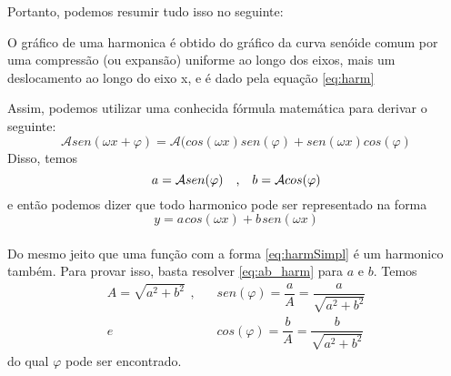Portanto, podemos resumir tudo isso no seguinte:\\
\begin{definicao}
    O gráfico de uma harmonica é obtido do gráfico da curva senóide 
    comum por uma compressão (ou expansão) uniforme ao longo dos eixos,
    mais um deslocamento ao longo do eixo x, e é dado pela equação \ref{eq:harm}
\end{definicao}


Assim, podemos utilizar uma conhecida fórmula matemática para derivar
o seguinte:\\
\begin{equation}
    \mathcal{A}sen(\omega x + \varphi) = \mathcal{A}(cos(\omega x)sen(\varphi) + sen(\omega x)cos(\varphi)
\end{equation}
Disso, temos\\
\begin{equation}
    a = \mathcal{A}sen(\varphi)\text{\hspace{10pt},\hspace{10pt}}b = \mathcal{A}cos(\varphi)
\label{eq:ab_harm}
\end{equation}
e então podemos dizer que todo harmonico pode ser representado na forma
\begin{equation}
    y = a \hspace{1pt}cos(\omega x) + b\hspace{1pt}sen(\omega x)
\label{eq:harmSimpl}
\end{equation}
\\
Do mesmo jeito que uma função com a forma \ref{eq:harmSimpl} é um harmonico também. 
Para provar isso, basta resolver \ref{eq:ab_harm} para $a$ e $b$. Temos
\begin{equation}
    \begin{split}
        A = \sqrt{a^2 + b^2}\hspace{5pt},\hspace{10pt} &sen(\varphi) = \dfrac{a}{A} = \dfrac{a}{\sqrt{a^2 + b^2}}\\
        e\hspace{10pt} & cos(\varphi) = \dfrac{b}{A} = \dfrac{b}{\sqrt{a^2 + b^2}}
    \end{split}
\end{equation} 
do qual $\varphi$ pode ser encontrado.\\

